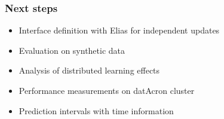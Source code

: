 \begin{frame}
	
	\frametitle{ Next steps }
	
	
	\begin{itemize}
		\item<1->  Interface definition with Elias for independent updates 
		
		\item<1-> Evaluation on synthetic data 
		
		\item<1->  Analysis of distributed learning  effects
		\item<1-> Performance measurements on datAcron cluster 
	    \item<1-> Prediction intervals with time information
	
	\end{itemize}
	
\end{frame}
